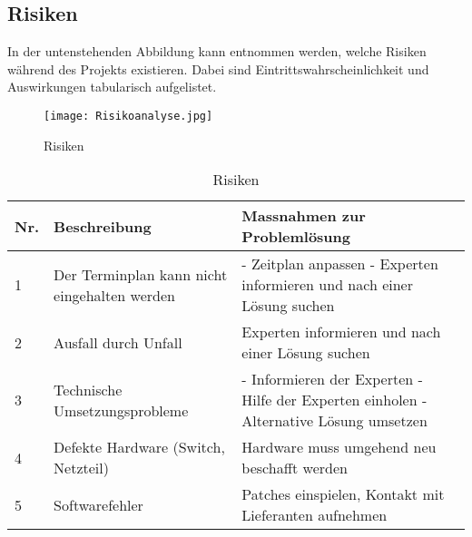 
\subsection{Risiken}
In der untenstehenden Abbildung kann entnommen werden, welche Risiken während des Projekts existieren. Dabei sind  Eintrittswahrscheinlichkeit und Auswirkungen tabularisch aufgelistet.
\begin{figure}[htb]
\centering
\texttt{[image: Risikoanalyse.jpg]}
\caption{Risiken}
\label{fig:Risk}
\end{figure} 

\begin{table}[H]
\centering
\begin{tabular}{p{1cm}p{6cm}p{9cm}}
\hline
\rowcolor{heading} \textbf{Nr.} & \textbf{Beschreibung} & \textbf{Massnahmen zur Problemlösung} \\\hline
1 & Der Terminplan kann nicht eingehalten werden & - Zeitplan anpassen \newline - Experten informieren und nach einer Lösung suchen \\\hline
2 & Ausfall durch Unfall & Experten informieren und nach einer Lösung suchen  \\\hline
3 & Technische Umsetzungsprobleme & - Informieren der Experten \newline - Hilfe der Experten einholen \newline - Alternative Lösung umsetzen \\\hline
4 & Defekte Hardware (Switch, Netzteil) & Hardware muss umgehend neu beschafft werden  \\\hline
5 & Softwarefehler & Patches einspielen, Kontakt mit Lieferanten aufnehmen  \\\hline
\end{tabular}
\caption{Risiken}
\end{table}


